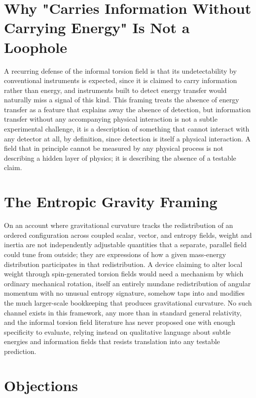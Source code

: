 \documentclass[11pt]{article}
\begin{document}
\section{Why "Carries Information Without Carrying Energy" Is Not a Loophole}

A recurring defense of the informal torsion field is that its undetectability by conventional instruments is expected, since it is claimed to carry information rather than energy, and instruments built to detect energy transfer would naturally miss a signal of this kind. This framing treats the absence of energy transfer as a feature that explains away the absence of detection, but information transfer without any accompanying physical interaction is not a subtle experimental challenge, it is a description of something that cannot interact with any detector at all, by definition, since detection is itself a physical interaction. A field that in principle cannot be measured by any physical process is not describing a hidden layer of physics; it is describing the absence of a testable claim.

\section{The Entropic Gravity Framing}

On an account where gravitational curvature tracks the redistribution of an ordered configuration across coupled scalar, vector, and entropy fields, weight and inertia are not independently adjustable quantities that a separate, parallel field could tune from outside; they are expressions of how a given mass-energy distribution participates in that redistribution. A device claiming to alter local weight through spin-generated torsion fields would need a mechanism by which ordinary mechanical rotation, itself an entirely mundane redistribution of angular momentum with no unusual entropy signature, somehow taps into and modifies the much larger-scale bookkeeping that produces gravitational curvature. No such channel exists in this framework, any more than in standard general relativity, and the informal torsion field literature has never proposed one with enough specificity to evaluate, relying instead on qualitative language about subtle energies and information fields that resists translation into any testable prediction.

\section{Objections}
\end{document}
